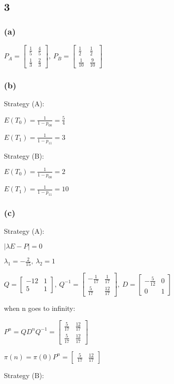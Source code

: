 \documentclass{article}
\begin{document}
\subsection*{3}
\subsubsection*{(a)}
$P_{A}=\begin{bmatrix}
\frac{1}{5}&\frac{4}{5}\\
\frac{1}{3}&\frac{2}{3}
\end{bmatrix}, \ 
P_{B}=\begin{bmatrix}
\frac{1}{2}&\frac{1}{2}\\
\frac{1}{10}&\frac{9}{10}
\end{bmatrix}$\par
\subsubsection*{(b)}
Strategy (A):\par
$E(T_{0})=\frac{1}{1-p_{00}}=\frac{5}{4}$\par
$E(T_{1})=\frac{1}{1-p_{11}}=3$\par
Strategy (B):\par
$E(T_{0})=\frac{1}{1-p_{00}}=2$\par
$E(T_{1})=\frac{1}{1-p_{11}}=10$\par
\subsubsection*{(c)}
Strategy (A):\par
$|\lambda E-P|=0$\par
$\lambda_{1}=-\frac{2}{15}, \ \lambda_{2}=1$\par\indent
\par
$Q=\begin{bmatrix}
-12&1\\
5&1
\end{bmatrix}, \  Q^{-1}=\begin{bmatrix}
-\frac{1}{17}&\frac{1}{17}\\
\frac{5}{17}&\frac{12}{17}
\end{bmatrix}, \ D=\begin{bmatrix}
-\frac{5}{12}&0\\
0&1
\end{bmatrix}  $\par\indent
\par
when n goes to infinity:\par\indent
\par
$P^{n}=QD^{n}Q^{-1}=\begin{bmatrix}
\frac{5}{17}&\frac{12}{17}\\
\frac{5}{17}&\frac{12}{17}
\end{bmatrix}$\par\indent
\par
$\pi(n)=\pi(0)P^{n}=\begin{bmatrix}
\frac{5}{17}&\frac{12}{17}
\end{bmatrix}$\par\indent
\par
Strategy (B):\par
\end{document}
